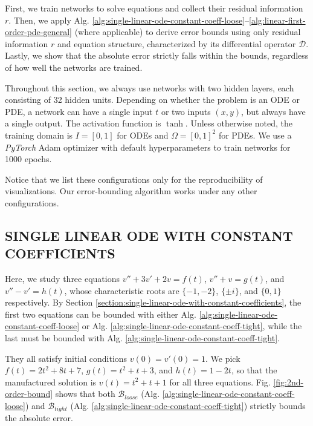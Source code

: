 \documentclass[accepted]{uai2023}
\newcommand{\Bound}{\mathcal{B}}
\begin{document}
    First, we train networks to solve equations and collect their residual information $r$.
    Then, we apply Alg. \ref{alg:single-linear-ode-constant-coeff-loose}--\ref{alg:linear-first-order-pde-general} (where applicable) to derive error bounds using only residual information $r$ and equation structure, characterized by its differential operator $\mathcal {D}$. 
    Lastly, we show that the absolute error strictly falls within the bounds, regardless of how well the networks are trained.

    Throughout this section, we always use networks with two hidden layers, each consisting of 32 hidden units.
    Depending on whether the problem is an ODE or PDE, a network can have a single input $t$ or two inputs $(x, y)$, but always have a single output.
    The activation function is $\tanh$. 
    Unless otherwise noted, the training domain is $I=[0, 1]$ for ODEs and $\Omega=[0,1]^2$ for PDEs. 
    We use a \textit{PyTorch} Adam optimizer with default hyperparameters to train networks for 1000 epochs.

    Notice that we list these configurations only for the reproducibility of visualizations. 
    Our error-bounding algorithm works under any other configurations.

\subsection{SINGLE LINEAR ODE WITH CONSTANT COEFFICIENTS}
    Here, we study three equations $v'' + 3v' + 2v = f(t)$, $v'' + v = g(t)$, and $v'' - v' = h(t)$, whose characteristic roots are $\{-1, -2\}$, $\{\pm i\}$, and $\{0, 1\}$ respectively. 
    By Section \ref{section:single-linear-ode-with-constant-coefficients}, the first two equations can be bounded with either Alg. \ref{alg:single-linear-ode-constant-coeff-loose} or Alg. \ref{alg:single-linear-ode-constant-coeff-tight}, while the last must be bounded with Alg. \ref{alg:single-linear-ode-constant-coeff-tight}.

    They all satisfy initial conditions $v(0) = v'(0) = 1$. 
    We pick $f(t) =2t^2+8t+7$, $g(t) = t^2+t+3$, and $h(t)=1-2t$, so that the manufactured solution is $v(t) = t^2 + t + 1$ for all three equations.
    Fig. \ref{fig:2nd-order-bound} shows that both $\Bound_{loose}$ (Alg. \ref{alg:single-linear-ode-constant-coeff-loose}) and $\Bound_{tight}$ (Alg. \ref{alg:single-linear-ode-constant-coeff-tight}) strictly bounds the absolute error.
    
\end{document}
